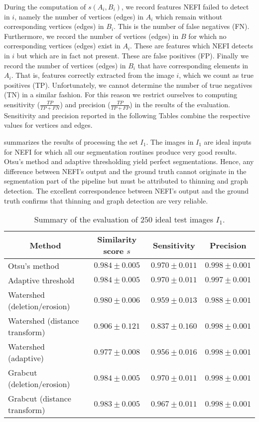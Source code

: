 		During the computation of $s(A_i, B_i)$, we record features NEFI failed to detect in $i$, namely the number of vertices (edges) in $A_i$ which remain without corresponding vertices (edges) in $B_i$. This is the number of false negatives (FN). Furthermore, we record the number of vertices (edges) in $B$ for which no corresponding vertices (edges) exist in $A_i$. These are features which NEFI detects in $i$ but which are in fact not present. These are false positives (FP). Finally we record the number of vertices (edges) in $B_i$ that have corresponding elements in $A_i$. That is, features correctly extracted from the image $i$, which we count as true positives (TP). Unfortunately, we cannot determine the number of true negatives (TN) in a similar fashion. For this reason we restrict ourselves to computing sensitivity ($\tfrac{TP}{TP + FN}$) and precision ($\tfrac{TP}{TP + FP}$) in the results of the evaluation. Sensitivity and precision reported in the following Tables combine the respective values for vertices and edges. 

		 summarizes the results of processing the set $I_1$. The images in $I_1$ are ideal inputs for NEFI for which all our segmentation routines produce very good results. Otsu's method and adaptive thresholding yield perfect segmentations. Hence, any difference between NEFI's output and the ground truth cannot originate in the segmentation part of the pipeline but must be attributed to thinning and graph detection. The excellent correspondence between NEFI's output and the ground truth confirms that thinning and graph detection are very reliable.

		\begin{table}
			\centering
			\begin{tabular}{@{} l *3c @{}}
			\toprule
			\multicolumn{1}{c}{Method}    & Similarity score $s$  & Sensitivity  & Precision \\ 
			\midrule
			Otsu's method                   & $0.984 \pm 0.005$ & $0.970 \pm 0.011$ & $0.998 \pm 0.001$ \\
			Adaptive threshold              & $0.984 \pm 0.005$ & $0.970 \pm 0.011$ & $0.997 \pm 0.001$ \\
			Watershed (deletion/erosion)    & $0.980 \pm 0.006$ & $0.959 \pm 0.013$ & $0.988 \pm 0.001$ \\
			Watershed (distance transform)  & $0.906 \pm 0.121$ & $0.837 \pm 0.160$ & $0.998 \pm 0.001$ \\
			Watershed (adaptive)            & $0.977 \pm 0.008$ & $0.956 \pm 0.016$ & $0.998 \pm 0.001$ \\
			Grabcut (deletion/erosion)      & $0.984 \pm 0.005$ & $0.970 \pm 0.011$ & $0.998 \pm 0.001$ \\
			Grabcut (distance transform)    & $0.983 \pm 0.005$ & $0.967 \pm 0.011$ & $0.998 \pm 0.001$ \\
			\bottomrule
			\end{tabular}
			\caption[NEFI's evaluation: Ideal images]{Summary of the evaluation of $250$ ideal test images $I_1$.}
			\label{tab:optimal}
		\end{table}

